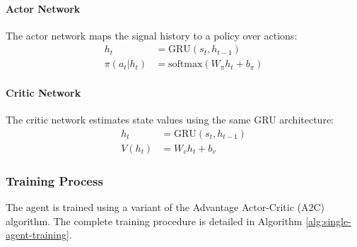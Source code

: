 \paragraph{Actor Network}
The actor network maps the signal history to a policy over actions:
\begin{align*}
    h_t &= \text{GRU}(s_t, h_{t-1}) \\
    \pi(a_t|h_t) &= \text{softmax}(W_\pi h_t + b_\pi)
\end{align*}

\paragraph{Critic Network}
The critic network estimates state values using the same GRU architecture:
\begin{align*}
    h_t &= \text{GRU}(s_t, h_{t-1}) \\
    V(h_t) &= W_v h_t + b_v
\end{align*}

\subsubsection*{Training Process}
The agent is trained using a variant of the Advantage Actor-Critic (A2C) algorithm. The complete training procedure is detailed in Algorithm \ref{alg:single-agent-training}.


